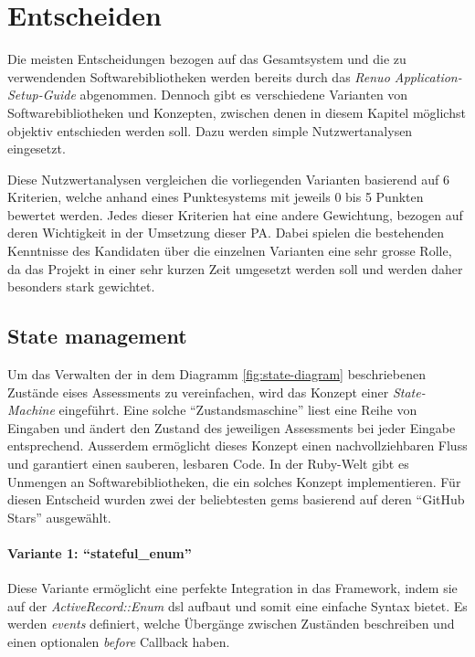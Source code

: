 \chapter{Entscheiden} \label{ch:decide}

Die meisten Entscheidungen bezogen auf das Gesamtsystem und die zu verwendenden Softwarebibliotheken werden bereits durch das
\emph{Renuo Application-Setup-Guide} abgenommen. Dennoch gibt es verschiedene Varianten von Softwarebibliotheken und Konzepten,
zwischen denen in diesem Kapitel möglichst objektiv entschieden werden soll. Dazu werden simple Nutzwertanalysen eingesetzt.

Diese Nutzwertanalysen vergleichen die vorliegenden Varianten basierend auf 6 Kriterien, welche anhand eines Punktesystems mit jeweils 0 bis 5 Punkten bewertet werden.
Jedes dieser Kriterien hat eine andere Gewichtung, bezogen auf deren Wichtigkeit in der Umsetzung dieser PA.
Dabei spielen die bestehenden Kenntnisse des Kandidaten über die einzelnen Varianten eine sehr grosse Rolle,
da das Projekt in einer sehr kurzen Zeit umgesetzt werden soll und werden daher besonders stark gewichtet.

\section{State management}
Um das Verwalten der in dem Diagramm \ref{fig:state-diagram} beschriebenen Zustände eises Assessments zu vereinfachen,
wird das Konzept einer \emph{State-Machine} eingeführt. Eine solche \enquote{Zustandsmaschine} liest eine Reihe von Eingaben
und ändert den Zustand des jeweiligen Assessments bei jeder Eingabe entsprechend. Ausserdem ermöglicht dieses Konzept einen nachvollziehbaren
Fluss und garantiert einen sauberen, lesbaren Code. In der Ruby-Welt gibt es Unmengen an Softwarebibliotheken, die ein solches Konzept implementieren.
Für diesen Entscheid wurden zwei der beliebtesten gems basierend auf deren \enquote{GitHub Stars} ausgewählt.

\subsubsection{Variante 1: \enquote{stateful\_enum}}

Diese Variante ermöglicht eine perfekte Integration in das Framework, indem sie auf der \emph{ActiveRecord::Enum} \gls{dsl} aufbaut und somit eine einfache Syntax bietet.
Es werden \emph{events} definiert, welche Übergänge zwischen Zuständen beschreiben und einen optionalen \emph{before} Callback haben.

